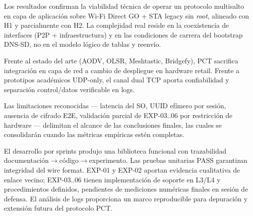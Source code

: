 
Los resultados confirman la viabilidad técnica de operar un protocolo multisalto en capa de aplicación sobre Wi-Fi Direct GO + STA legacy sin \emph{root}, alineado con H1 y parcialmente con H2. La complejidad real reside en la coexistencia de interfaces (P2P + infraestructura) y en las condiciones de carrera del bootstrap DNS-SD, no en el modelo lógico de tablas y reenvío.

Frente al estado del arte (AODV, OLSR, Meshtastic, Bridgefy), PCT sacrifica integración en capa de red a cambio de despliegue en hardware retail. Frente a prototipos académicos UDP-only, el canal dual TCP aporta confiabilidad y separación control/datos verificable en logs.

Las limitaciones reconocidas — latencia del SO, UUID efímero por sesión, ausencia de cifrado E2E, validación parcial de EXP-03..06 por restricción de hardware — delimitan el alcance de las conclusiones finales, las cuales se consolidarán cuando las métricas empíricas estén completas.


El desarrollo por sprints produjo una biblioteca funcional con trazabilidad documentación$\rightarrow$código$\rightarrow$experimento. Las pruebas unitarias PASS garantizan integridad del wire format. EXP-01 y EXP-02 aportan evidencia cualitativa de enlace vecino; EXP-03..06 tienen implementación de soporte en L3/L4 y procedimientos definidos, pendientes de mediciones numéricas finales en sesión de defensa. El análisis de logs proporciona un marco reproducible para depuración y extensión futura del protocolo PCT.

